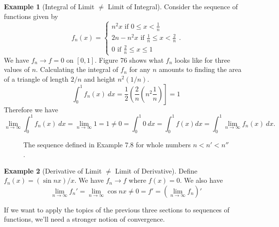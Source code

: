 \documentclass{article}
\newcommand{\R}{\mathbb{R}}
\theoremstyle{definition}
\newtheorem{example}{Example}[section]
\begin{document}
	\begin{example}[Integral of Limit $ \neq $ Limit of Integral]
		Consider the sequence of functions given by $$ f_n(x)=\begin{cases}
			n^2x\text{ if } 0\le x<\frac{1}{n}\\
			2n-n^2x\text{ if } \frac{1}{n}\le x <\frac{2}{n}\\
			0\text{ if } \frac{2}{n}\le x\le 1
		\end{cases}.$$ We have $ f_n\to f=0 $ on $ [0,1] $. Figure 76 shows what $ f_n $ looks like for three values of $ n $. Calculating the integral of $ f_n $ for any $ n $ amounts to finding the area of a triangle of length $ 2/n $ and height $ n^2(1/n) $. $$ \int_{0}^1f_n(x)\ dx=\frac{1}{2}\left(\frac{2}{n}\left(n^2\frac{1}{n}\right)\right]=1 $$ Therefore we have $$\lim\limits_{n\to\infty}\int_{0}^{1}f_n(x)\ dx=\lim\limits_{n\to\infty}1=1\neq 0=\int_{0}^{1}0\ dx=\int_{0}^{1} f(x) dx=\int_{0}^{1}\lim\limits_{n\to\infty} f_n(x)\ dx.$$
		\begin{figure}[h!]
			\centering
			\caption{The sequence defined in Example 7.8 for whole numbers $ n<n'<n'' $. }
		\end{figure}
		
	\end{example} 
	\begin{example}[Derivative of Limit $ \neq $ Limit of Derivative]
		Define $ f_n(x)=(\sin nx) / x $. We have $f_n\to f$ where $ f(x)=0 $. We also have $$ \lim\limits_{n\to\infty}f_n'=\lim\limits_{n\to\infty}\cos nx\neq 0=f'=\left(\lim\limits_{n\to\infty}f_n\right)'$$
	\end{example}
	If we want to apply the topics of the previous three sections to sequences of functions, we'll need a stronger notion of convergence.  
\end{document}
